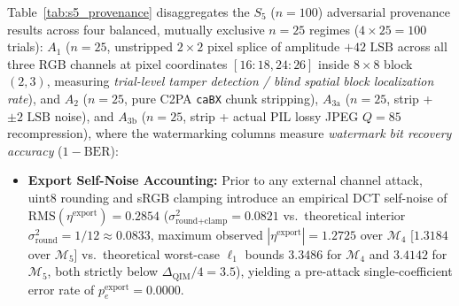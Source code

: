 \documentclass[conference,10pt]{IEEEtran}
\begin{document}
Table~\ref{tab:s5_provenance} disaggregates the $S_5$ ($n=100$) adversarial provenance results across four balanced, mutually exclusive $n=25$ regimes ($4\times 25 = 100$ trials): $A_1$ ($n=25$, unstripped $2\times 2$ pixel splice of amplitude $+42\text{ LSB}$ across all three RGB channels at pixel coordinates $[16:18, 24:26]$ inside $8\times 8$ block $(2,3)$, measuring \emph{trial-level tamper detection / blind spatial block localization rate}), and $A_2$ ($n=25$, pure C2PA \texttt{caBX} chunk stripping), $A_{3\text{a}}$ ($n=25$, strip + $\pm 2\text{ LSB}$ noise), and $A_{3\text{b}}$ ($n=25$, strip + actual PIL lossy JPEG $Q=85$ recompression), where the watermarking columns measure \emph{watermark bit recovery accuracy} ($1 - \mathrm{BER}$):
\begin{itemize}
    \item \textbf{Export Self-Noise Accounting:} Prior to any external channel attack, $\mathrm{uint8}$ rounding and sRGB clamping introduce an empirical DCT self-noise of $\mathrm{RMS}(\eta^{\text{export}}) = 0.2854$ ($\sigma_{\text{round+clamp}}^2 = 0.0821$ vs.\ theoretical interior $\sigma_{\text{round}}^2 = 1/12 \approx 0.0833$, maximum observed $|\eta^{\text{export}}| = 1.2725$ over $\mathcal{M}_4$ [$1.3184$ over $\mathcal{M}_5$] vs.\ theoretical worst-case $\ell_1$ bounds $3.3486$ for $\mathcal{M}_4$ and $3.4142$ for $\mathcal{M}_5$, both strictly below $\Delta_{\text{QIM}}/4 = 3.5$), yielding a pre-attack single-coefficient error rate of $p_e^{\text{export}} = 0.0000$.

\end{itemize}
\end{document}
